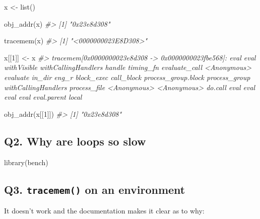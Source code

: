 \documentclass[
]{book}
\newenvironment{Shaded}{\begin{snugshade}}{\end{snugshade}}
\newcommand{\CommentTok}[1]{\textcolor[rgb]{0.56,0.35,0.01}{\textit{#1}}}
\newcommand{\DecValTok}[1]{\textcolor[rgb]{0.00,0.00,0.81}{#1}}
\newcommand{\FunctionTok}[1]{\textcolor[rgb]{0.00,0.00,0.00}{#1}}
\newcommand{\NormalTok}[1]{#1}
\newcommand{\OtherTok}[1]{\textcolor[rgb]{0.56,0.35,0.01}{#1}}
\begin{document}
\begin{Shaded}
\begin{Highlighting}[]
\NormalTok{x }\OtherTok{\textless{}{-}} \FunctionTok{list}\NormalTok{()}

\FunctionTok{obj\_addr}\NormalTok{(x)}
\CommentTok{\#\textgreater{} [1] "0x23e8d308"}

\FunctionTok{tracemem}\NormalTok{(x)}
\CommentTok{\#\textgreater{} [1] "\textless{}0000000023E8D308\textgreater{}"}

\NormalTok{x[[}\DecValTok{1}\NormalTok{]] }\OtherTok{\textless{}{-}}\NormalTok{ x}
\CommentTok{\#\textgreater{} tracemem[0x0000000023e8d308 {-}\textgreater{} 0x0000000023fbe568]: eval eval withVisible withCallingHandlers handle timing\_fn evaluate\_call \textless{}Anonymous\textgreater{} evaluate in\_dir eng\_r block\_exec call\_block process\_group.block process\_group withCallingHandlers process\_file \textless{}Anonymous\textgreater{} \textless{}Anonymous\textgreater{} do.call eval eval eval eval eval.parent local}

\FunctionTok{obj\_addr}\NormalTok{(x[[}\DecValTok{1}\NormalTok{]])}
\CommentTok{\#\textgreater{} [1] "0x23e8d308"}
\end{Highlighting}
\end{Shaded}

\hypertarget{q2.-why-are-loops-so-slow}{%
\subsection*{Q2. Why are loops so slow}\label{q2.-why-are-loops-so-slow}}

\begin{Shaded}
\begin{Highlighting}[]
\FunctionTok{library}\NormalTok{(bench)}
\end{Highlighting}
\end{Shaded}

\hypertarget{q3.-tracemem-on-an-environment}{%
\subsection*{\texorpdfstring{Q3. \texttt{tracemem()} on an environment}{Q3. tracemem() on an environment}}\label{q3.-tracemem-on-an-environment}}

It doesn't work and the documentation makes it clear as to why:
\end{document}
